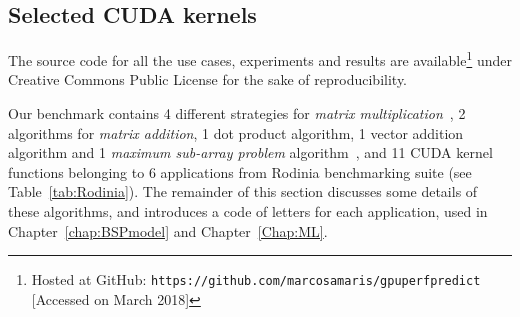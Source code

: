
\begin{table}[htpb]
    \centering
    \caption{Hardware specifications of the GPUs in the testbed}
    \label{tab:GPUs}
\end{table}

\subsection{Selected CUDA kernels}\label{ssec:useCases}
The  source code for all the use cases, experiments and results are available\footnote{Hosted at GitHub: \texttt{\scriptsize https://github.com/marcosamaris/gpuperfpredict} [Accessed on March 2018]} under Creative Commons Public License for the sake of reproducibility. 

Our benchmark contains 4 different strategies for \emph{matrix multiplication}~\citep{CUDAGuide}, 2 algorithms for \emph{matrix addition}, 1 dot product algorithm, 1 vector addition algorithm and 1 \emph{maximum sub-array problem} algorithm~\citep{Cleber:Thesis}, and 11 CUDA kernel functions belonging to 6 applications from Rodinia benchmarking suite (see Table~\ref{tab:Rodinia}). The remainder of this section discusses some details of these algorithms, and introduces a code of letters for each application, used in Chapter~\ref{chap:BSPmodel} and Chapter~\ref{Chap:ML}.

